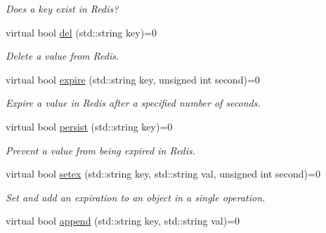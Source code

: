 \begin{DoxyCompactItemize}
\begin{DoxyCompactList}\small\item\em Does a key exist in Redis? \end{DoxyCompactList}\item 
\hypertarget{classRedisInterface_a320ec4f76fd83d767dc476a6ca330957}{virtual bool \hyperlink{classRedisInterface_a320ec4f76fd83d767dc476a6ca330957}{del} (std\-::string key)=0}\label{classRedisInterface_a320ec4f76fd83d767dc476a6ca330957}

\begin{DoxyCompactList}\small\item\em Delete a value from Redis. \end{DoxyCompactList}\item 
\hypertarget{classRedisInterface_a1bccb873c675701ce5f9c828067ba37f}{virtual bool \hyperlink{classRedisInterface_a1bccb873c675701ce5f9c828067ba37f}{expire} (std\-::string key, unsigned int second)=0}\label{classRedisInterface_a1bccb873c675701ce5f9c828067ba37f}

\begin{DoxyCompactList}\small\item\em Expire a value in Redis after a specified number of seconds. \end{DoxyCompactList}\item 
\hypertarget{classRedisInterface_ac2eaaa5dc9647ac1663e967deea12431}{virtual bool \hyperlink{classRedisInterface_ac2eaaa5dc9647ac1663e967deea12431}{persist} (std\-::string key)=0}\label{classRedisInterface_ac2eaaa5dc9647ac1663e967deea12431}

\begin{DoxyCompactList}\small\item\em Prevent a value from being expired in Redis. \end{DoxyCompactList}\item 
\hypertarget{classRedisInterface_abded05a0334cf85620cd1b0662466e42}{virtual bool \hyperlink{classRedisInterface_abded05a0334cf85620cd1b0662466e42}{setex} (std\-::string key, std\-::string val, unsigned int second)=0}\label{classRedisInterface_abded05a0334cf85620cd1b0662466e42}

\begin{DoxyCompactList}\small\item\em Set and add an expiration to an object in a single operation. \end{DoxyCompactList}\item 
\hypertarget{classRedisInterface_a8a5f2b9c3d401a0170f7d966919868c4}{virtual bool \hyperlink{classRedisInterface_a8a5f2b9c3d401a0170f7d966919868c4}{append} (std\-::string key, std\-::string val)=0}\label{classRedisInterface_a8a5f2b9c3d401a0170f7d966919868c4}


\end{DoxyCompactItemize}
